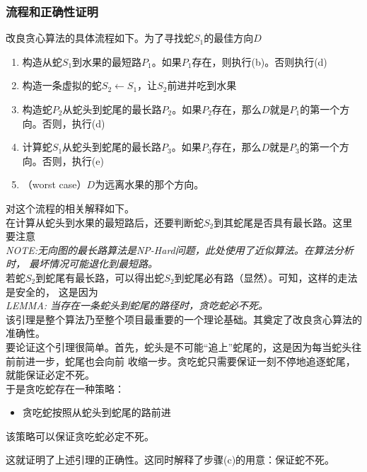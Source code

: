 \documentclass[a4paper]{article}
\begin{document}
\subsubsection{流程和正确性证明}
改良贪心算法的具体流程如下。为了寻找蛇$S_1$的最佳方向$D$
\begin{enumerate}[label=(\alph*)]
    \item 构造从蛇$S_1$到水果的最短路$P_1$。如果$P_1$存在，则执行(b)。否则执行(d)
    \item 构造一条虚拟的蛇$S_2 \gets S_1$，让$S_2$前进并吃到水果
    \item 构造蛇$P_2$从蛇头到蛇尾的最长路$P_2$。如果$P_2$存在，那么$D$就是$P_1$的第一个方向。否则，执行(d)
    \item 计算蛇$S_1$从蛇头到蛇尾的最长路$P_3$。如果$P_3$存在，那么$D$就是$P_3$的第一个方向。否则，执行(e)
    \item （worst case）$D$为远离水果的那个方向。
\end{enumerate}
对这个流程的相关解释如下。\\

在计算从蛇头到水果的最短路后，还要判断蛇$S_2$到其蛇尾是否具有最长路。这里要注意\\

\emph{NOTE:无向图的最长路算法是NP-Hard问题，此处使用了近似算法。在算法分析时，
最坏情况可能退化到最短路。}\\

若蛇$S_2$到蛇尾有最长路，可以得出蛇$S_2$到蛇尾必有路（显然）。可知，这样的走法是安全的，
这是因为\\

\emph{LEMMA: 当存在一条蛇头到蛇尾的路径时，贪吃蛇必不死。}\\

该引理是整个算法乃至整个项目最重要的一个理论基础。其奠定了改良贪心算法的准确性。\\

要论证这个引理很简单。首先，蛇头是不可能``追上''蛇尾的，这是因为每当蛇头往前前进一步，蛇尾也会向前
收缩一步。贪吃蛇只需要保证一刻不停地追逐蛇尾，就能保证必定不死。\\

于是贪吃蛇存在一种策略：
\begin{itemize}
    \item 贪吃蛇按照从蛇头到蛇尾的路前进
\end{itemize}
该策略可以保证贪吃蛇必定不死。

这就证明了上述引理的正确性。这同时解释了步骤(c)的用意：保证蛇不死。\\
\end{document}

